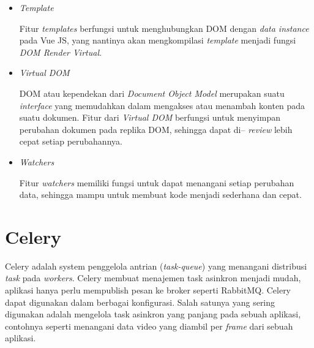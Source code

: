 \begin{itemize}
  \item \textit{Template}
  
  Fitur \textit{templates} berfungsi untuk menghubungkan DOM dengan \textit{data instance} pada Vue JS, yang nantinya akan mengkompilasi \textit{template} menjadi fungsi \textit{DOM Render Virtual}.

  \item \textit{Virtual DOM}
  
  DOM atau kependekan dari \textit{Document Object Model} merupakan suatu \textit{interface} yang memudahkan dalam mengakses atau menambah konten pada suatu dokumen. Fitur dari \textit{Virtual DOM} berfungsi untuk menyimpan perubahan dokumen pada replika DOM, sehingga dapat di-- \textit{review} lebih cepat setiap perubahannya.

  \item \textit{Watchers}
  
  Fitur \textit{watchers} memiliki fungsi untuk dapat menangani setiap perubahan data, sehingga mampu untuk membuat kode menjadi sederhana dan cepat.



\end{itemize}

\section{Celery}

Celery adalah system penggelola antrian (\textit{task-queue}) yang menangani distribusi \textit{task} pada \textit{workers}.
Celery membuat menajemen task asinkron menjadi mudah, aplikasi hanya perlu mempublish pesan ke broker seperti RabbitMQ.
Celery dapat digunakan dalam berbagai konfigurasi.
Salah satunya yang sering digunakan adalah mengelola task asinkron yang panjang pada sebuah aplikasi,
contohnya seperti menangani data video yang diambil per \textit{frame} dari sebuah aplikasi.




